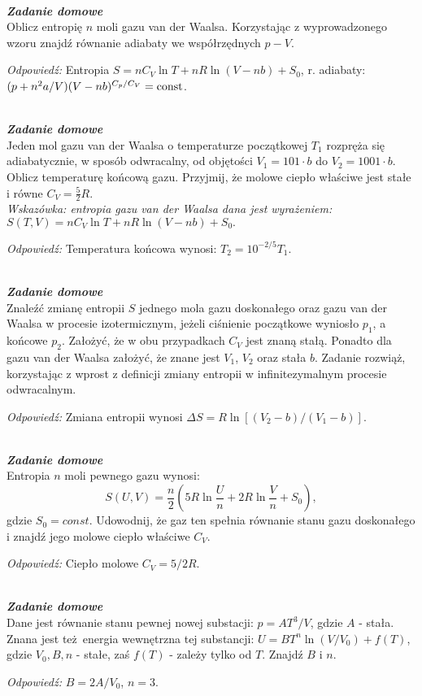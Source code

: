 \documentclass[11pt,a4paper]{article}
\newcounter{zadanie}\newcommand{\zadanie}[1][]{\addtocounter{zadanie}{1} ~\\  {\bf \emph{Zadanie \arabic{zadanie} #1 }} \\}
\newcounter{zaddom}\newcommand{\zaddom}[1][]{\addtocounter{zaddom}{1} ~\\  {\bf \emph{Zadanie domowe \arabic{zaddom} #1 }} \\}
\begin{document}
\pagebreak
\zaddom
Oblicz entropię $n$ moli gazu van der Waalsa. Korzystając z wyprowadzonego
wzoru znajdź równanie adiabaty we współrzędnych $p - V$.

\vspace{5mm}
{\em Odpowiedź:} Entropia $S = n C_V \ln T + nR \ln (V - nb) + S_0$, r. adiabaty: $(p + n^2 a/ V)(V-nb)^{C_p/C_V} = {\rm const}$.


\zaddom
Jeden mol gazu van der Waalsa o temperaturze początkowej $T_1$ rozpręża się
adiabatycznie, w sposób odwracalny, od objętości $V_1 = 101\cdot b$ do
$V_2 = 1001\cdot b$. Oblicz temperaturę końcową gazu. Przyjmij, że
molowe ciepło właściwe jest stałe i równe $C_V=\frac{5}{2}R$.\\[3mm]
{\em Wskazówka: entropia gazu van der Waalsa dana jest wyrażeniem:\\
$\displaystyle S(T,V) = n C_V \ln{T} + n R \ln{(V-nb)} + S_0.$ }

\vspace{5mm}
{\em Odpowiedź:} Temperatura końcowa wynosi: $T_2 = 10^{-2/5} T_1$.  

\zaddom
Znaleźć zmianę entropii $S$ jednego mola gazu doskonałego oraz gazu van der Waalsa w procesie 
izotermicznym, jeżeli ciśnienie początkowe wyniosło $p_1$, a końcowe $p_2$. 
Założyć, że w obu przypadkach $C_V$ jest znaną stałą.
Ponadto dla gazu van der Waalsa założyć, że znane jest $V_1$, $V_2$ oraz stała $b$.
Zadanie rozwiąż, korzystając z wprost z definicji zmiany entropii 
w infinitezymalnym procesie odwracalnym. 

\vspace{5mm}
{\em Odpowiedź:} Zmiana entropii wynosi $\Delta S =  R \ln[ (V_2 - b)/(V_1 - b)]$. 

\zaddom
Entropia $n$ moli pewnego gazu wynosi:
\[ S(U,V) = \frac{n}{2}\left( 5 R \ln{\frac{U}{n}} + 2 R \ln{\frac{V}{n}} + S_0 \right)\!,\]
gdzie $S_0=const$. Udowodnij, że gaz ten spełnia równanie stanu gazu doskonałego
i znajdź jego molowe ciepło właściwe $C_V$.

\vspace{5mm}
{\em Odpowiedź:} Ciepło molowe $C_V = 5/2 R$. 


\zaddom
Dane jest równanie stanu pewnej nowej substacji: $p=A T^3 /V$, gdzie $A$ - stała. 
Znana jest też energia wewnętrzna tej substancji: $U= B T^n \ln(V/V_0)+ f(T)$,
gdzie $V_0, B, n$ - stałe, zaś $ f(T)$ - zależy tylko od $T$. Znajdź $B$ i $n$.

\vspace{5mm}
{\em Odpowiedź:} $B= 2A/V_0$, $n=3$.





\end{document}
